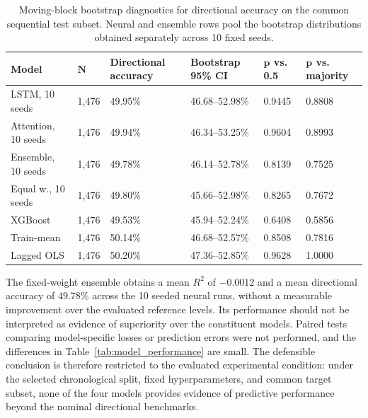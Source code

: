 \documentclass[utf8]{FrontiersinHarvard} %
\begin{document}
\begin{table}[h]
	\color{red}
\caption{Moving-block bootstrap diagnostics for directional accuracy on the common sequential test subset. Neural and ensemble rows pool the bootstrap distributions obtained separately across 10 fixed seeds.}
	\label{tab:moving_block_bootstrap}
	\setlength{\tabcolsep}{3pt}
	\centering
	\begin{tabular}{p{92pt}p{42pt}p{76pt}p{72pt}p{62pt}p{70pt}}
		\hline
		\textbf{Model} &
		\(\boldsymbol{N}\) &
		\textbf{Directional accuracy} &
		\textbf{Bootstrap 95\% CI} &
		\(\boldsymbol{p}\) \textbf{vs. 0.5} &
		\(\boldsymbol{p}\) \textbf{vs. majority} \\
		\hline
		LSTM, 10 seeds & 1,476 & 49.95\% & 46.68--52.98\% & 0.9445 & 0.8808 \\
		Attention, 10 seeds & 1,476 & 49.94\% & 46.34--53.25\% & 0.9604 & 0.8993 \\
		Ensemble, 10 seeds & 1,476 & 49.78\% & 46.14--52.78\% & 0.8139 & 0.7525 \\
		Equal w., 10 seeds & 1,476 & 49.80\% & 45.66--52.98\% & 0.8265 & 0.7672 \\
		XGBoost & 1,476 & 49.53\% & 45.94--52.24\% & 0.6408 & 0.5856 \\
		Train-mean & 1,476 & 50.14\% & 46.68--52.57\% & 0.8508 & 0.7816 \\
		Lagged OLS & 1,476 & 50.20\% & 47.36--52.85\% & 0.9628 & 1.0000 \\
		\hline
	\end{tabular}
	\footnotesize
\end{table}

The fixed-weight ensemble obtains a mean \(R^2\) of \(-0.0012\) and a mean directional accuracy of \(49.78\%\) across the 10 seeded neural runs, without a measurable improvement over the evaluated reference levels. Its performance should not be interpreted as evidence of superiority over the constituent models. Paired tests comparing model-specific losses or prediction errors were not performed, and the differences in Table~\ref{tab:model_performance} are small. The defensible conclusion is therefore restricted to the evaluated experimental condition: under the selected chronological split, fixed hyperparameters, and common target subset, none of the four models provides evidence of predictive performance beyond the nominal directional benchmarks.
\end{document}

